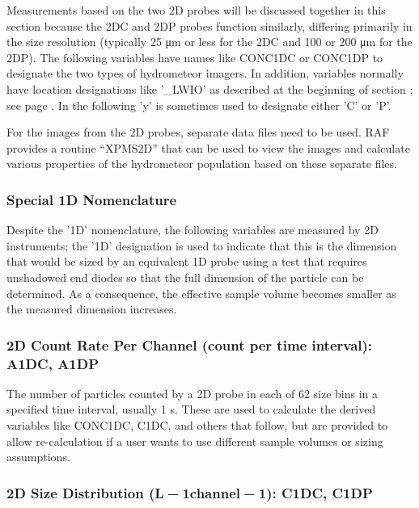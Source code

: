 \documentclass[
  english,
]{book}
\begin{document}
Measurements based on the two 2D probes will be discussed together in this section because the 2DC and 2DP probes function similarly, differing primarily in the size resolution (typically 25 {μ}m or less for the 2DC and 100 or 200 {μ}m for the 2DP). The following variables have names like CONC1DC or CONC1DP to designate the two types of hydrometeor imagers. In addition, variables normally have location designations like '\_LWIO' as described at the beginning of section ; see page . In the following 'y' is sometimes used to designate either 'C' or 'P'.

For the images from the 2D probes, separate data files need to be used. RAF provides a routine ``XPMS2D'' that can be used to view the images and calculate various properties of the hydrometeor population based on these separate files.

\hypertarget{special-1d-nomenclature}{%
\subsubsection*{Special 1D Nomenclature}\label{special-1d-nomenclature}}

\protect\hypertarget{Despite-the-ux271Dux27}{}{}Despite the '1D' nomenclature, the following variables are measured by 2D instruments; the '1D' designation is used to indicate that this is the dimension that would be sized by an equivalent 1D probe using a test that requires unshadowed end diodes so that the full dimension of the particle can be determined. As a consequence, the effective sample volume becomes smaller as the measured dimension increases.

\hypertarget{a1dc-a1dp}{%
\subsubsection*{2D Count Rate Per Channel (count per time interval): A1DC, A1DP}\label{a1dc-a1dp}}

The number of particles counted by a 2D probe in each of 62 size bins in a specified time interval, usually 1 s. These are used to calculate the derived variables like CONC1DC, C1DC, and others that follow, but are provided to allow re-calculation if a user wants to use different sample volumes or sizing assumptions.

\hypertarget{c1dc-c1dp}{%
\subsubsection*{\texorpdfstring{2D Size Distribution (L{ − 1}channel{ − 1}): C1DC, C1DP}{2D Size Distribution (L − 1channel − 1): C1DC, C1DP}}\label{c1dc-c1dp}}
\end{document}
